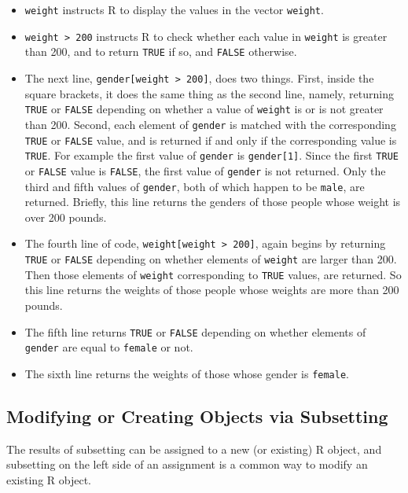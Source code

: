 \documentclass[
]{krantz}
\providecommand{\tightlist}{%
  \setlength{\itemsep}{0pt}\setlength{\parskip}{0pt}}
\begin{document}
\begin{itemize}
\tightlist
\item
  \texttt{weight} instructs R to display the values in the vector \texttt{weight}.
\item
  \texttt{weight\ \textgreater{}\ 200} instructs R to check whether each value in \texttt{weight} is greater than 200, and to return \texttt{TRUE} if so, and \texttt{FALSE} otherwise.
\item
  The next line, \texttt{gender{[}weight\ \textgreater{}\ 200{]}}, does two things. First, inside the square brackets, it does the same thing as the second line, namely, returning \texttt{TRUE} or \texttt{FALSE} depending on whether a value of \texttt{weight} is or is not greater than 200. Second, each element of \texttt{gender} is matched with the corresponding \texttt{TRUE} or \texttt{FALSE} value, and is returned if and only if the corresponding value is \texttt{TRUE}. For example the first value of \texttt{gender} is \texttt{gender{[}1{]}}. Since the first \texttt{TRUE} or \texttt{FALSE} value is \texttt{FALSE}, the first value of \texttt{gender} is not returned. Only the third and fifth values of \texttt{gender}, both of which happen to be \texttt{male}, are returned. Briefly, this line returns the genders of those people whose weight is over 200 pounds.
\item
  The fourth line of code, \texttt{weight{[}weight\ \textgreater{}\ 200{]}}, again begins by returning \texttt{TRUE} or \texttt{FALSE} depending on whether elements of \texttt{weight} are larger than 200. Then those elements of \texttt{weight} corresponding to \texttt{TRUE} values, are returned. So this line returns the weights of those people whose weights are more than 200 pounds.
\item
  The fifth line returns \texttt{TRUE} or \texttt{FALSE} depending on whether elements of \texttt{gender} are equal to \texttt{female} or not.
\item
  The sixth line returns the weights of those whose gender is \texttt{female}.
\end{itemize}

\hypertarget{modifying-or-creating-objects-via-subsetting}{%
\subsection{Modifying or Creating Objects via Subsetting}\label{modifying-or-creating-objects-via-subsetting}}

The results of subsetting can be assigned to a new (or existing) R object, and subsetting on the left side of an assignment is a common way to modify an existing R object.
\end{document}
